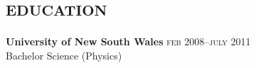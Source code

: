

\vspace{-0.6cm}
\section*{\textsc{education}}
\vspace{-0.2cm}

\textbf{University of New South Wales}\tabto{9.5cm} \textsc{feb} 2008--\textsc{july} 2011\\
Bachelor Science (Physics)
\vspace{-0.3cm}


